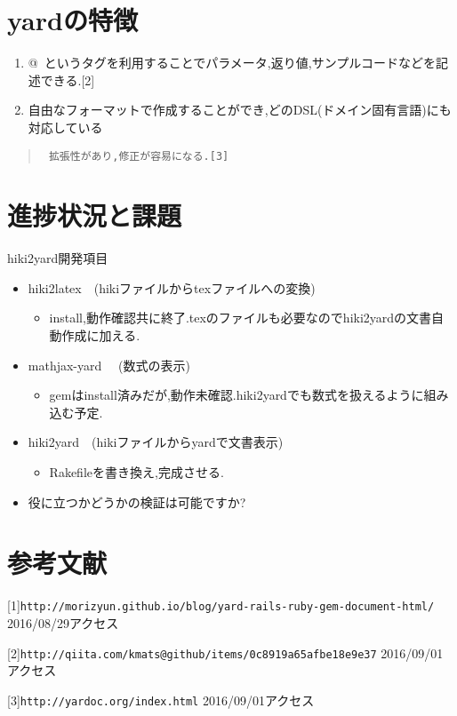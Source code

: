 \documentclass[10pt,a4j,twocolumn]{jsarticle}
\begin{document}
\section{yardの特徴}\begin{enumerate}
\item @~というタグを利用することでパラメータ,返り値,サンプルコードなどを記述できる.[2]
\item 自由なフォーマットで作成することができ,どのDSL(ドメイン固有言語)にも対応している
\end{enumerate}\begin{quote}\begin{verbatim}
 拡張性があり,修正が容易になる.[3]
\end{verbatim}\end{quote}
\section{進捗状況と課題}
hiki2yard開発項目
\begin{itemize}
\item hiki2latex　(hikiファイルからtexファイルへの変換)\begin{itemize}
\item install,動作確認共に終了.texのファイルも必要なのでhiki2yardの文書自動作成に加える.
\end{itemize}
\item mathjax-yard 　(数式の表示)\begin{itemize}
\item gemはinstall済みだが,動作未確認.hiki2yardでも数式を扱えるように組み込む予定.
\end{itemize}
\item hiki2yard　(hikiファイルからyardで文書表示)\begin{itemize}
\item Rakefileを書き換え,完成させる.
\end{itemize}
\end{itemize}\begin{itemize}
\item 役に立つかどうかの検証は可能ですか?
\end{itemize}
\section{参考文献}
[1]\verb|http://morizyun.github.io/blog/yard-rails-ruby-gem-document-html/| 2016/08/29アクセス

[2]\verb|http://qiita.com/kmats@github/items/0c8919a65afbe18e9e37| 2016/09/01アクセス

[3]\verb|http://yardoc.org/index.html| 2016/09/01アクセス
\end{document}

